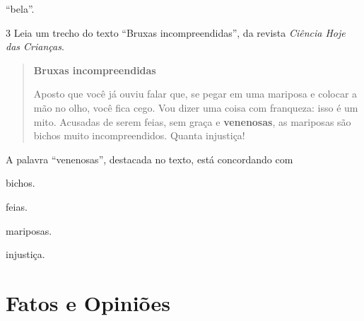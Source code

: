 \begin{conteudo}
\begin{conteudo}
\begin{conteudo}
\begin{conteudo}
\begin{multicols}{2}
\begin{escolha}
\item ``bela''.
\end{escolha}
\end{multicols}

\pagebreak
\num{3} Leia um trecho do texto ``Bruxas incompreendidas'',
da revista \textit{Ciência Hoje das Crianças}.

\begin{quote}
\textbf{Bruxas incompreendidas}

Aposto que você já ouviu falar que, se pegar em uma mariposa e colocar a
mão no olho, você fica cego. Vou dizer uma coisa com franqueza: isso é
um mito. Acusadas de serem feias, sem graça e \textbf{venenosas}, as
mariposas são bichos muito incompreendidos. Quanta injustiça!

\end{quote}

A palavra ``venenosas'', destacada no texto, está concordando com

\begin{escolha}
\item bichos.

\item feias.

\item mariposas.

\item injustiça.
\end{escolha}

\chapter{Fatos e Opiniões}



\end{conteudo}
\end{conteudo}
\end{conteudo}
\end{conteudo}
